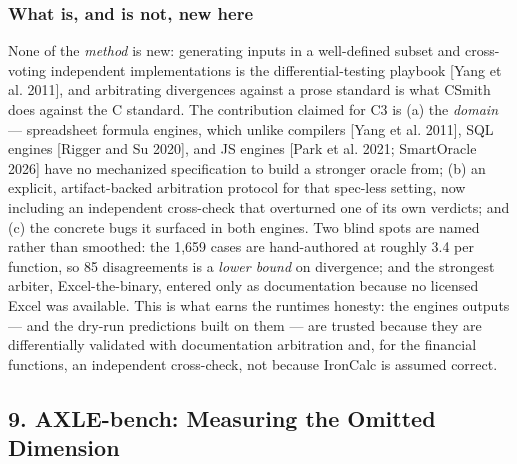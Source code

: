 \documentclass[
]{article}
\begin{document}
\subsubsection{What is, and is not, new
here}\label{what-is-and-is-not-new-here}

None of the \emph{method} is new: generating inputs in a well-defined
subset and cross-voting independent implementations is the
differential-testing playbook {[}Yang et al. 2011{]}, and arbitrating
divergences against a prose standard is what CSmith does against the C
standard. The contribution claimed for C3 is (a) the \emph{domain} ---
spreadsheet formula engines, which unlike compilers {[}Yang et al.
2011{]}, SQL engines {[}Rigger and Su 2020{]}, and JS engines {[}Park et
al. 2021; SmartOracle 2026{]} have no mechanized specification to build
a stronger oracle from; (b) an explicit, artifact-backed arbitration
protocol for that spec-less setting, now including an independent
cross-check that overturned one of its own verdicts; and (c) the
concrete bugs it surfaced in both engines. Two blind spots are named
rather than smoothed: the 1,659 cases are hand-authored at roughly 3.4
per function, so 85 disagreements is a \emph{lower bound} on divergence;
and the strongest arbiter, Excel-the-binary, entered only as
documentation because no licensed Excel was available. This is what
earns the runtime\textquotesingle s honesty: the
engine\textquotesingle s outputs --- and the dry-run predictions built
on them --- are trusted because they are differentially validated with
documentation arbitration and, for the financial functions, an
independent cross-check, not because IronCalc is assumed correct.

\subsection{9. AXLE-bench: Measuring the Omitted
Dimension}\label{9-axle-bench-measuring-the-omitted-dimension}
\end{document}
